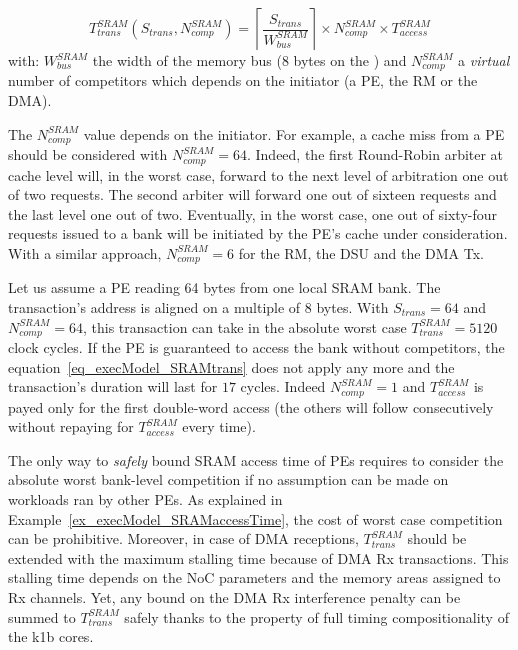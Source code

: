 \documentclass[main.tex]{subfiles}
\begin{document}
\begin{equation}
    \label{eq_execModel_SRAMtrans}
    T_{trans}^{SRAM} ( S_{trans} , N_{comp}^{SRAM} ) = \left\lceil \dfrac{S_{trans}}{W_{bus}^{SRAM}} \right\rceil \times N_{comp}^{SRAM} \times T_{access}^{SRAM}
\end{equation}
with: $W_{bus}^{SRAM}$ the width of the memory bus (8 bytes on the \mppalong) and $N_{comp}^{SRAM}$ a \emph{virtual} number of competitors which depends on the initiator (a PE, the RM or the DMA).

The $N_{comp}^{SRAM}$ value depends on the initiator. For example, a cache miss
from a PE should be considered with $N_{comp}^{SRAM} = 64$. Indeed, the first
Round-Robin arbiter at cache level will, in the worst case, forward to the next
level of arbitration one out of two requests. The second arbiter will forward
one out of sixteen requests and the last level one out of two. Eventually, in
the worst case, one out of sixty-four requests issued to a bank will be
initiated by the PE's cache under consideration. With a similar approach,
$N_{comp}^{SRAM} = 6$ for the RM, the DSU and the DMA Tx.

\begin{example}
    \label{ex_execModel_SRAMaccessTime} Let us assume a PE reading 64 bytes
    from one local SRAM bank. The transaction's address is aligned on a
    multiple of 8 bytes. With $S_{trans} = 64$ and $N_{comp}^{SRAM} = 64$, this
    transaction can take in the absolute worst case $T_{trans}^{SRAM} = 5120$
    clock cycles. If the PE is guaranteed to access the bank without
    competitors, the equation~\ref{eq_execModel_SRAMtrans} does not apply any
    more and the transaction's duration will last for $17$ cycles. Indeed
    $N_{comp}^{SRAM}=1$ and $T_{access}^{SRAM}$ is payed only for the first
    double-word access (the others will follow consecutively without repaying
    for $T_{access}^{SRAM}$ every time).
\end{example}

The only way to \emph{safely} bound SRAM access time of PEs requires to
consider the absolute worst bank-level competition if no assumption can be made
on workloads ran by other PEs. As explained in
Example~\ref{ex_execModel_SRAMaccessTime}, the cost of worst case competition
can be prohibitive.  Moreover, in case of DMA receptions, $T_{trans}^{SRAM}$
should be extended with the maximum stalling time because of DMA Rx
transactions. This stalling time depends on the NoC parameters and the memory
areas assigned to Rx channels. Yet, any bound on the DMA Rx interference
penalty can be summed to $T_{trans}^{SRAM}$ safely thanks to the property of
full timing compositionality of the k1b cores.
\end{document}
